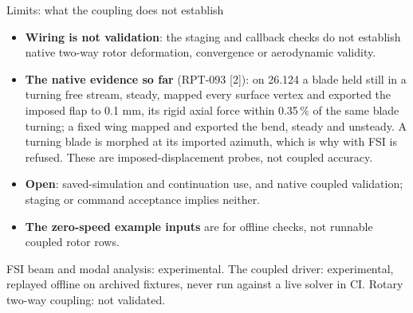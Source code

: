 \begin{frame}{Limits: what the coupling does not establish}
\begin{itemize}\small
  \item \textbf{Wiring is not validation}: the staging and callback checks do
        not establish native two-way rotor deformation, convergence or
        aerodynamic validity.
  \item \textbf{The native evidence so far} (RPT-093 [2]): on 26.124 a blade
        held still in a turning free stream, steady, mapped every surface
        vertex and exported the imposed flap to 0.1 mm, its rigid axial force
        within 0.35\,\% of the same blade turning; a fixed wing mapped and
        exported the bend, steady and unsteady. A turning blade is morphed at
        its imported azimuth, which is why  with FSI is
        refused. These are imposed-displacement probes, not coupled accuracy.
  \item \textbf{Open}: saved-simulation and continuation use, and native
        coupled validation; staging or command acceptance implies neither.
  \item \textbf{The zero-speed example inputs} are for offline checks, not
        runnable coupled rotor rows.
\end{itemize}
\begin{ftslimit}
\scriptsize FSI beam and modal analysis: experimental. The coupled driver:
experimental, replayed offline on archived fixtures, never run against a live
solver in CI. Rotary two-way coupling: not validated.
\end{ftslimit}
\vspace{-1.5mm}
\end{frame}

